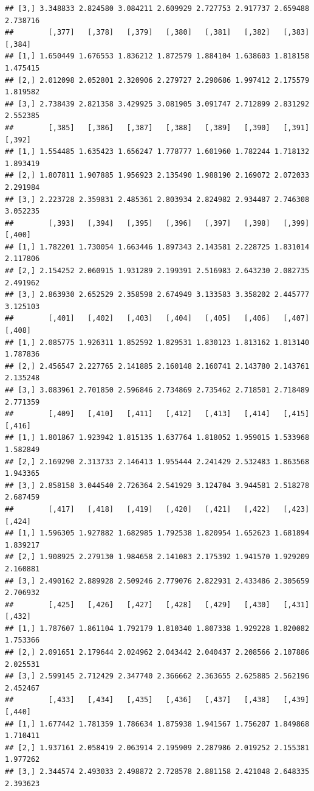 \documentclass[article]{jss}\usepackage[]{graphicx}\usepackage[]{xcolor}
\makeatletter
\newenvironment{kframe}{%
 \def\at@end@of@kframe{}%
 \ifinner\ifhmode%
  \def\at@end@of@kframe{\end{minipage}}%
  \begin{minipage}{\columnwidth}%
 \fi\fi%
 \def\FrameCommand##1{\hskip\@totalleftmargin \hskip-\fboxsep
 \colorbox{shadecolor}{##1}\hskip-\fboxsep
     \hskip-\linewidth \hskip-\@totalleftmargin \hskip\columnwidth}%
 \MakeFramed {\advance\hsize-\width
   \@totalleftmargin\z@ \linewidth\hsize
   \@setminipage}}%
 {\par\unskip\endMakeFramed%
 \at@end@of@kframe}
\newenvironment{knitrout}{}{} %
\makeatother
\begin{document}
\begin{knitrout}
\begin{kframe}
\begin{verbatim}
## [3,] 3.348833 2.824580 3.084211 2.609929 2.727753 2.917737 2.659488 2.738716
##        [,377]   [,378]   [,379]   [,380]   [,381]   [,382]   [,383]   [,384]
## [1,] 1.650449 1.676553 1.836212 1.872579 1.884104 1.638603 1.818158 1.475415
## [2,] 2.012098 2.052801 2.320906 2.279727 2.290686 1.997412 2.175579 1.819582
## [3,] 2.738439 2.821358 3.429925 3.081905 3.091747 2.712899 2.831292 2.552385
##        [,385]   [,386]   [,387]   [,388]   [,389]   [,390]   [,391]   [,392]
## [1,] 1.554485 1.635423 1.656247 1.778777 1.601960 1.782244 1.718132 1.893419
## [2,] 1.807811 1.907885 1.956923 2.135490 1.988190 2.169072 2.072033 2.291984
## [3,] 2.223728 2.359831 2.485361 2.803934 2.824982 2.934487 2.746308 3.052235
##        [,393]   [,394]   [,395]   [,396]   [,397]   [,398]   [,399]   [,400]
## [1,] 1.782201 1.730054 1.663446 1.897343 2.143581 2.228725 1.831014 2.117806
## [2,] 2.154252 2.060915 1.931289 2.199391 2.516983 2.643230 2.082735 2.491962
## [3,] 2.863930 2.652529 2.358598 2.674949 3.133583 3.358202 2.445777 3.125103
##        [,401]   [,402]   [,403]   [,404]   [,405]   [,406]   [,407]   [,408]
## [1,] 2.085775 1.926311 1.852592 1.829531 1.830123 1.813162 1.813140 1.787836
## [2,] 2.456547 2.227765 2.141885 2.160148 2.160741 2.143780 2.143761 2.135248
## [3,] 3.083961 2.701850 2.596846 2.734869 2.735462 2.718501 2.718489 2.771359
##        [,409]   [,410]   [,411]   [,412]   [,413]   [,414]   [,415]   [,416]
## [1,] 1.801867 1.923942 1.815135 1.637764 1.818052 1.959015 1.533968 1.582849
## [2,] 2.169290 2.313733 2.146413 1.955444 2.241429 2.532483 1.863568 1.943365
## [3,] 2.858158 3.044540 2.726364 2.541929 3.124704 3.944581 2.518278 2.687459
##        [,417]   [,418]   [,419]   [,420]   [,421]   [,422]   [,423]   [,424]
## [1,] 1.596305 1.927882 1.682985 1.792538 1.820954 1.652623 1.681894 1.839217
## [2,] 1.908925 2.279130 1.984658 2.141083 2.175392 1.941570 1.929209 2.160881
## [3,] 2.490162 2.889928 2.509246 2.779076 2.822931 2.433486 2.305659 2.706932
##        [,425]   [,426]   [,427]   [,428]   [,429]   [,430]   [,431]   [,432]
## [1,] 1.787607 1.861104 1.792179 1.810340 1.807338 1.929228 1.820082 1.753366
## [2,] 2.091651 2.179644 2.024962 2.043442 2.040437 2.208566 2.107886 2.025531
## [3,] 2.599145 2.712429 2.347740 2.366662 2.363655 2.625885 2.562196 2.452467
##        [,433]   [,434]   [,435]   [,436]   [,437]   [,438]   [,439]   [,440]
## [1,] 1.677442 1.781359 1.786634 1.875938 1.941567 1.756207 1.849868 1.710411
## [2,] 1.937161 2.058419 2.063914 2.195909 2.287986 2.019252 2.155381 1.977262
## [3,] 2.344574 2.493033 2.498872 2.728578 2.881158 2.421048 2.648335 2.393623

\end{verbatim}
\end{kframe}
\end{knitrout}
\end{document}
